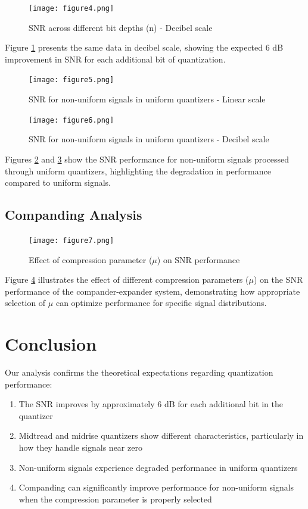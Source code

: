 \documentclass{article}
\begin{document}
\begin{figure}[H]
    \centering
    \texttt{[image: figure4.png]}
    \caption{SNR across different bit depths (n) - Decibel scale}
    \label{fig:snr_db}
\end{figure}

Figure \ref{fig:snr_db} presents the same data in decibel scale, showing the expected 6 dB improvement in SNR for each additional bit of quantization.

\begin{figure}[H]
    \centering
    \texttt{[image: figure5.png]}
    \caption{SNR for non-uniform signals in uniform quantizers - Linear scale}
    \label{fig:nonuniform_linear}
\end{figure}

\begin{figure}[H]
    \centering
    \texttt{[image: figure6.png]}
    \caption{SNR for non-uniform signals in uniform quantizers - Decibel scale}
    \label{fig:nonuniform_db}
\end{figure}

Figures \ref{fig:nonuniform_linear} and \ref{fig:nonuniform_db} show the SNR performance for non-uniform signals processed through uniform quantizers, highlighting the degradation in performance compared to uniform signals.

\subsection{Companding Analysis}

\begin{figure}[H]
    \centering
    \texttt{[image: figure7.png]}
    \caption{Effect of compression parameter ($\mu$) on SNR performance}
    \label{fig:companding}
\end{figure}

Figure \ref{fig:companding} illustrates the effect of different compression parameters ($\mu$) on the SNR performance of the compander-expander system, demonstrating how appropriate selection of $\mu$ can optimize performance for specific signal distributions.

\section{Conclusion}

Our analysis confirms the theoretical expectations regarding quantization performance:

\begin{enumerate}
    \item The SNR improves by approximately 6 dB for each additional bit in the quantizer
    \item Midtread and midrise quantizers show different characteristics, particularly in how they handle signals near zero
    \item Non-uniform signals experience degraded performance in uniform quantizers
    \item Companding can significantly improve performance for non-uniform signals when the compression parameter is properly selected
\end{enumerate}
\end{document}
